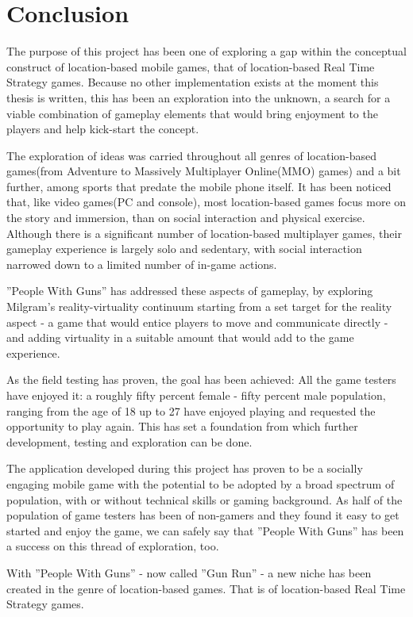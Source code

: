 
\section{Conclusion}

The purpose of this project has been one of exploring a gap within the
conceptual construct of location-based mobile games, that of location-based Real
Time Strategy games. Because no other implementation exists at the moment this
thesis is written, this has been an exploration into the unknown, a search for a
viable combination of gameplay elements that would bring enjoyment to the
players and help kick-start the concept.\newline

The exploration of ideas was carried throughout all genres of location-based
games(from Adventure to Massively Multiplayer Online(MMO) games) and a bit
further, among sports that predate the mobile phone itself. It has been noticed
that, like video games(PC and console), most location-based games focus more on
the story and immersion, than on social interaction and physical exercise.
Although there is a significant number of location-based multiplayer games,
their gameplay experience is largely solo and sedentary, with social interaction
narrowed down to a limited number of in-game actions.\newline

''People With Guns'' has addressed these aspects of gameplay, by exploring
Milgram's reality-virtuality continuum starting from a set target for the
reality aspect - a game that would entice players to move and communicate
directly - and adding virtuality in a suitable amount that would add to the game
experience.\newline

As the field testing has proven, the goal has been achieved: All the game
testers have enjoyed it: a roughly fifty percent female - fifty percent male
population, ranging from the age of 18 up to 27 have enjoyed playing and
requested the opportunity to play again. This has set a foundation from
which further development, testing and exploration can be done.\newline

The application developed during this project has proven to be a socially
engaging mobile game with the potential to be adopted by a broad spectrum of
population, with or without technical skills or gaming background. As half of
the population of game testers has been of non-gamers and they found it easy to
get started and enjoy the game, we can safely say that ''People With Guns'' has
been a success on this thread of exploration, too. \newline

With ''People With Guns'' - now called ''Gun Run'' - a new niche has been
created in the genre of location-based games. That is of location-based Real Time
Strategy games.\newline


